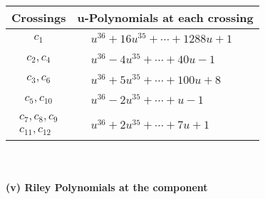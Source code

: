 \documentclass[1p]{elsarticle_modified}
\theoremstyle{definition}
\begin{document}
\begin{tabular}{m{50pt}|m{274pt}}
Crossings & \hspace{64pt}u-Polynomials at each crossing \\
\hline $$\begin{aligned}c_{1}\end{aligned}$$&$\begin{aligned}
&u^{36}+16 u^{35}+\cdots+1288 u+1
\end{aligned}$\\
\hline $$\begin{aligned}c_{2},c_{4}\end{aligned}$$&$\begin{aligned}
&u^{36}-4 u^{35}+\cdots+40 u-1
\end{aligned}$\\
\hline $$\begin{aligned}c_{3},c_{6}\end{aligned}$$&$\begin{aligned}
&u^{36}+5 u^{35}+\cdots+100 u+8
\end{aligned}$\\
\hline $$\begin{aligned}c_{5},c_{10}\end{aligned}$$&$\begin{aligned}
&u^{36}-2 u^{35}+\cdots+u-1
\end{aligned}$\\
\hline $$\begin{aligned}c_{7},c_{8},c_{9}\\c_{11},c_{12}\end{aligned}$$&$\begin{aligned}
&u^{36}+2 u^{35}+\cdots+7 u+1
\end{aligned}$\\
\hline
\end{tabular}\\~\\
\newpage\renewcommand{\arraystretch}{1}
\flushleft \textbf{(v) Riley Polynomials at the component}\newline \\
\end{document}
